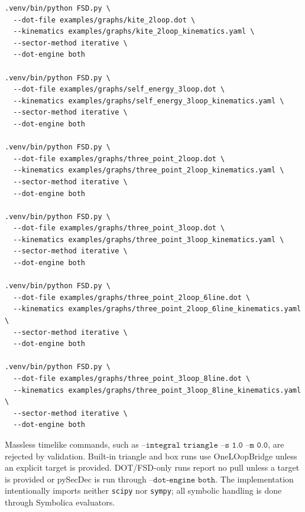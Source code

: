 \documentclass[11pt]{article}
\begin{document}
\begin{lstlisting}[style=fsdcode]
.venv/bin/python FSD.py \
  --dot-file examples/graphs/kite_2loop.dot \
  --kinematics examples/graphs/kite_2loop_kinematics.yaml \
  --sector-method iterative \
  --dot-engine both

.venv/bin/python FSD.py \
  --dot-file examples/graphs/self_energy_3loop.dot \
  --kinematics examples/graphs/self_energy_3loop_kinematics.yaml \
  --sector-method iterative \
  --dot-engine both

.venv/bin/python FSD.py \
  --dot-file examples/graphs/three_point_2loop.dot \
  --kinematics examples/graphs/three_point_2loop_kinematics.yaml \
  --sector-method iterative \
  --dot-engine both

.venv/bin/python FSD.py \
  --dot-file examples/graphs/three_point_3loop.dot \
  --kinematics examples/graphs/three_point_3loop_kinematics.yaml \
  --sector-method iterative \
  --dot-engine both

.venv/bin/python FSD.py \
  --dot-file examples/graphs/three_point_2loop_6line.dot \
  --kinematics examples/graphs/three_point_2loop_6line_kinematics.yaml \
  --sector-method iterative \
  --dot-engine both

.venv/bin/python FSD.py \
  --dot-file examples/graphs/three_point_3loop_8line.dot \
  --kinematics examples/graphs/three_point_3loop_8line_kinematics.yaml \
  --sector-method iterative \
  --dot-engine both
\end{lstlisting}
Massless timelike commands, such as
\(\texttt{--integral triangle --s 1.0 --m 0.0}\), are rejected by validation.
Built-in triangle and box runs use OneLOopBridge unless an explicit target is
provided.  DOT/FSD-only runs report no pull unless a target is provided or
pySecDec is run through \(\texttt{--dot-engine both}\).  The implementation
intentionally imports neither \texttt{scipy} nor \texttt{sympy}; all symbolic
handling is done through Symbolica evaluators.
\end{document}
